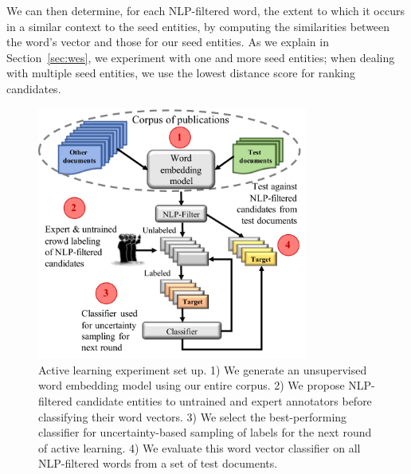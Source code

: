 We can then determine, for each NLP-filtered word, the extent to which it occurs
in a similar context to the seed entities, by computing the similarities
between the word's vector and those for our seed entities. 
As we explain in Section~\ref{sec:wes}, we experiment with one and more seed entities; 
when dealing with multiple seed entities,
we use the lowest distance score for ranking candidates.

\begin{figure}
\centering
\includegraphics[trim=0.15in 0.1in 0in 0.in,clip,width=3.5in]{figures/al_setup.pdf}
\caption{\label{fig:current} Active learning experiment set up. 1) We generate an unsupervised word embedding model using our entire corpus. 2) We propose NLP-filtered candidate entities to untrained and expert annotators before classifying their word vectors. 3) We select the best-performing classifier for uncertainty-based sampling of labels for the next round of active learning. 4) We evaluate this word vector classifier on all NLP-filtered words from a set of test documents. 
}
\end{figure}

